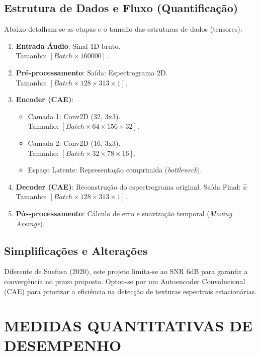 \documentclass{article}
\begin{document}
\subsection{Estrutura de Dados e Fluxo (Quantificação)}
\label{ssec:flow}

Abaixo detalham-se as etapas e o tamaño das estruturas de dados (tensores):
\begin{enumerate}
    \item \textbf{Entrada Áudio}: Sinal 1D bruto. \\ Tamanho: $[Batch \times 160000]$.
    \item \textbf{Pré-processamento}: Saída: Espectrograma 2D. \\ Tamanho: $[Batch \times 128 \times 313 \times 1]$.
    \item \textbf{Encoder (CAE)}:
    \begin{itemize}
        \item Camada 1: Conv2D (32, 3x3). \\ Tamanho: $[Batch \times 64 \times 156 \times 32]$.
        \item Camada 2: Conv2D (16, 3x3). \\ Tamanho: $[Batch \times 32 \times 78 \times 16]$.
        \item Espaço Latente: Representação comprimida (\textit{bottleneck}).
    \end{itemize}
    \item \textbf{Decoder (CAE)}: Reconstrução do espectrograma original. Saída Final: $\hat{x}$ \\ Tamanho: $[Batch \times 128 \times 313 \times 1]$.
    \item \textbf{Pós-processamento}: Cálculo de erro e suavização temporal (\textit{Moving Average}).
\end{enumerate}

\subsection{Simplificações e Alterações}
\label{ssec:changes}

Diferente de Suefusa (2020), este projeto limita-se ao SNR 6dB para garantir a convergência no prazo proposto. Optou-se por um Autoencoder Convolucional (CAE) para priorizar a eficiência na detecção de texturas espectrais estacionárias.

\section{MEDIDAS QUANTITATIVAS DE DESEMPENHO}
\label{sec:perf}
\end{document}
